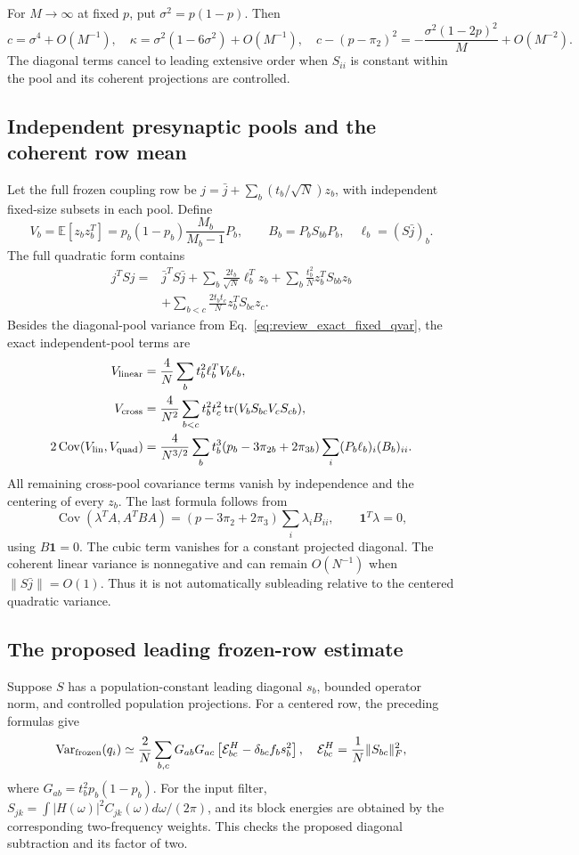 For $M\to\infty$ at fixed $p$, put $\sigma^2=p(1-p)$. Then
\[
 c=\sigma^4+O(M^{-1}),\quad
 \kappa=\sigma^2(1-6\sigma^2)+O(M^{-1}),\quad
 c-(p-\pi_2)^2=-\frac{\sigma^2(1-2p)^2}{M}+O(M^{-2}).
\]
The diagonal terms cancel to leading extensive order when $S_{ii}$ is
constant within the pool and its coherent projections are controlled.

\subsection{Independent presynaptic pools and the coherent row mean}
Let the full frozen coupling row be
$j=\bar j+\sum_b(t_b/\sqrt N)z_b$, with independent fixed-size subsets
in each pool. Define
\[
 V_b=\mathbb E[z_bz_b^T]
 =p_b(1-p_b)\frac{M_b}{M_b-1}P_b,\qquad
 B_b=P_bS_{bb}P_b,\quad \ell_b=(S\bar j)_b.
\]
The full quadratic form contains
\begin{align*}
 j^TSj={}&\bar j^TS\bar j
 +\sum_b\frac{2t_b}{\sqrt N}\ell_b^Tz_b
 +\sum_b\frac{t_b^2}{N}z_b^TS_{bb}z_b\\
 &+\sum_{b<c}\frac{2t_bt_c}{N}z_b^TS_{bc}z_c.
\end{align*}
Besides the diagonal-pool variance from
Eq.~\eqref{eq:review_exact_fixed_qvar}, the exact independent-pool terms are
\begin{align*}
 V_{\rm linear}&=\frac4N\sum_bt_b^2\ell_b^TV_b\ell_b,\\
 V_{\rm cross}&=\frac4{N^2}\sum_{b<c}t_b^2t_c^2
                  \operatorname{tr}(V_bS_{bc}V_cS_{cb}),\\
 2\operatorname{Cov}(V_{\rm lin},V_{\rm quad})
 &=\frac4{N^{3/2}}\sum_bt_b^3(p_b-3\pi_{2b}+2\pi_{3b})
                   \sum_i(P_b\ell_b)_i(B_b)_{ii}.
\end{align*}
All remaining cross-pool covariance terms vanish by independence and the
centering of every $z_b$. The last formula follows from
\[
 \operatorname{Cov}(\lambda^TA,A^TBA)
 =(p-3\pi_2+2\pi_3)\sum_i\lambda_iB_{ii},\qquad
 \mathbf1^T\lambda=0,
\]
using $B\mathbf1=0$. The cubic term vanishes for a constant projected
diagonal. The coherent linear variance is nonnegative and can remain
$O(N^{-1})$ when $\|S\bar j\|=O(1)$. Thus it is not automatically
subleading relative to the centered quadratic variance.

\subsection{The proposed leading frozen-row estimate}
Suppose $S$ has a population-constant leading diagonal $s_b$, bounded
operator norm, and controlled population projections. For a centered row,
the preceding formulas give
\begin{equation}
 \operatorname{Var}_{\rm frozen}(q_i)
 \simeq\frac2N\sum_{b,c}G_{ab}G_{ac}
 \left[\mathcal E^H_{bc}-\delta_{bc}f_b s_b^2\right],
 \quad
 \mathcal E^H_{bc}=\frac1N\|S_{bc}\|_F^2,
 \label{eq:review_frozen_Vq}
\end{equation}
where $G_{ab}=t_b^2p_b(1-p_b)$. For the input filter,
$S_{jk}=\int |H(\omega)|^2 C_{jk}(\omega)d\omega/(2\pi)$, and its block
energies are obtained by the corresponding two-frequency weights. This
checks the proposed diagonal subtraction and its factor of two.

